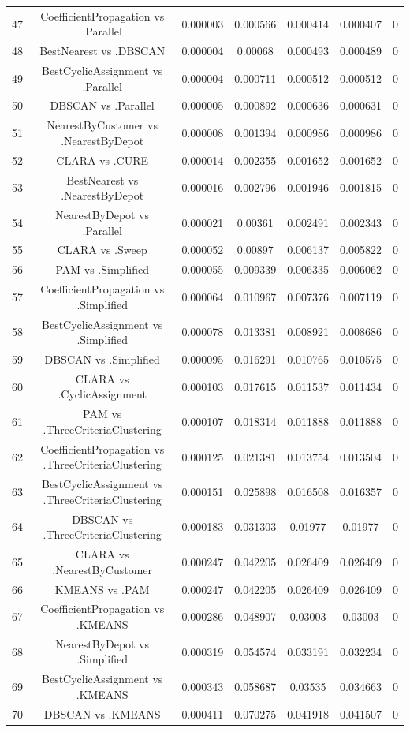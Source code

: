 \documentclass[a4paper,10pt]{article}
\begin{document}
\begin{landscape}
\begin{table}[!htp]
\begin{tabular}{ccccccc}
47&CoefficientPropagation vs .Parallel&0.000003&0.000566&0.000414&0.000407&0\\
48&BestNearest vs .DBSCAN&0.000004&0.00068&0.000493&0.000489&0\\
49&BestCyclicAssignment vs .Parallel&0.000004&0.000711&0.000512&0.000512&0\\
50&DBSCAN vs .Parallel&0.000005&0.000892&0.000636&0.000631&0\\
51&NearestByCustomer vs .NearestByDepot&0.000008&0.001394&0.000986&0.000986&0\\
52&CLARA vs .CURE&0.000014&0.002355&0.001652&0.001652&0\\
53&BestNearest vs .NearestByDepot&0.000016&0.002796&0.001946&0.001815&0\\
54&NearestByDepot vs .Parallel&0.000021&0.00361&0.002491&0.002343&0\\
55&CLARA vs .Sweep&0.000052&0.00897&0.006137&0.005822&0\\
56&PAM vs .Simplified&0.000055&0.009339&0.006335&0.006062&0\\
57&CoefficientPropagation vs .Simplified&0.000064&0.010967&0.007376&0.007119&0\\
58&BestCyclicAssignment vs .Simplified&0.000078&0.013381&0.008921&0.008686&0\\
59&DBSCAN vs .Simplified&0.000095&0.016291&0.010765&0.010575&0\\
60&CLARA vs .CyclicAssignment&0.000103&0.017615&0.011537&0.011434&0\\
61&PAM vs .ThreeCriteriaClustering&0.000107&0.018314&0.011888&0.011888&0\\
62&CoefficientPropagation vs .ThreeCriteriaClustering&0.000125&0.021381&0.013754&0.013504&0\\
63&BestCyclicAssignment vs .ThreeCriteriaClustering&0.000151&0.025898&0.016508&0.016357&0\\
64&DBSCAN vs .ThreeCriteriaClustering&0.000183&0.031303&0.01977&0.01977&0\\
65&CLARA vs .NearestByCustomer&0.000247&0.042205&0.026409&0.026409&0\\
66&KMEANS vs .PAM&0.000247&0.042205&0.026409&0.026409&0\\
67&CoefficientPropagation vs .KMEANS&0.000286&0.048907&0.03003&0.03003&0\\
68&NearestByDepot vs .Simplified&0.000319&0.054574&0.033191&0.032234&0\\
69&BestCyclicAssignment vs .KMEANS&0.000343&0.058687&0.03535&0.034663&0\\
70&DBSCAN vs .KMEANS&0.000411&0.070275&0.041918&0.041507&0\\

\end{tabular}
\end{table}
\end{landscape}
\end{document}
